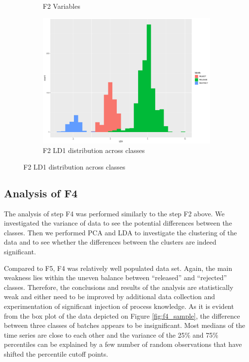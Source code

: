 \begin{figure}
\begin{subfigure}{0.3\textwidth}
\begin{center}
        \end{center}
        \caption{F2 Variables}
        \label{fig:f2_variables}
    \end{subfigure}%
    \begin{subfigure}{0.3\textwidth}
        \begin{center}
        \includegraphics[width=\textwidth]{plots/f2_LD1.pdf}
        \end{center}
        \caption{F2 LD1 distribution across classes}
        \label{fig:f2_LD1}
    \end{subfigure}
\end{figure}


\subsection{Analysis of F4}
The analysis of step F4 was performed similarly to the step F2 above. We investigated the variance of data to see the potential differences between the classes. Then we performed PCA and LDA to investigate the clustering of the data and to see whether the differences between the clusters are indeed significant.

Compared to F5, F4 was relatively well populated data set. Again, the main weakness lies within the uneven balance between ``released'' and ``rejected'' classes. Therefore, the conclusions and results of the analysis are statistically weak and either need to be improved by additional data collection and experimentation of significant injection of process knowledge. As it is evident from the box plot of the data depicted on Figure \ref{fig:f4_sample}, the difference between three classes of batches appears to be insignificant. Most medians of the time series are close to each other and the variance of the 25\% and 75\% percentiles can be explained by a few number of random observations that have shifted the percentile cutoff points. 

